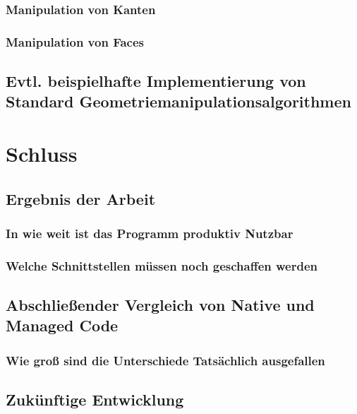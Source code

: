 \documentclass[12pt,a4paper]{scrreprt}
\begin{document}
		\subsection {Manipulation von Kanten}
		\subsection {Manipulation von Faces}
	\section {Evtl. beispielhafte Implementierung von Standard Geometriemanipulationsalgorithmen}





\chapter {Schluss}
	\section {Ergebnis der Arbeit}
		\subsection {In wie weit ist das Programm produktiv Nutzbar}
		\subsection {Welche Schnittstellen müssen noch geschaffen werden}
	\section {Abschließender Vergleich von Native und Managed Code}
		\subsection {Wie groß sind die Unterschiede Tatsächlich ausgefallen}
	\section {Zukünftige Entwicklung}






\newpage
\end{document}
